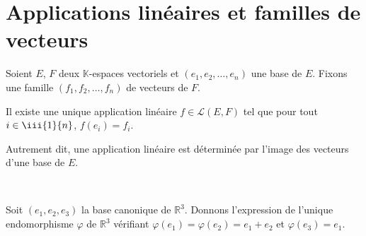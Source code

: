 \documentclass[french,11pt,twoside]{VcCours}
\begin{document}
\section{Applications linéaires et familles de vecteurs}

\begin{Proposition}{} Soient $E$, $F$ deux $\mathbb{K}$-espaces vectoriels et $(e_1, e_2, \ldots, e_n)$ une base de $E$. Fixons une famille $(f_1, f_2, \ldots, f_n)$ de vecteurs de $F$. 

Il existe une unique application linéaire $f \in \mathcal{L}(E,F)$ tel que pour tout $i \in \iii{1}{n}$, $f(e_i)=f_i$.

Autrement dit, une application linéaire est déterminée par l'image des vecteurs d'une base de $E$.
\end{Proposition}

\
%

\begin{Exemple} Soit $(e_1, e_2, e_3)$ la base canonique de $\mathbb{R}^3$. 
	Donnons l'expression de l'unique endomorphisme $\varphi$ de $\mathbb{R}^3$ 
	vérifiant $\varphi(e_1)= \varphi(e_2)= e_1+e_2$ et $\varphi(e_3)=e_1$.
\end{Exemple}

\newpage
\end{document}
